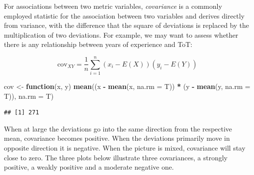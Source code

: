 \documentclass[]{svmono}
\newenvironment{Shaded}{\begin{snugshade}}{\end{snugshade}}
\newcommand{\KeywordTok}[1]{\textcolor[rgb]{0.13,0.29,0.53}{\textbf{#1}}}
\newcommand{\DataTypeTok}[1]{\textcolor[rgb]{0.13,0.29,0.53}{#1}}
\newcommand{\StringTok}[1]{\textcolor[rgb]{0.31,0.60,0.02}{#1}}
\newcommand{\ControlFlowTok}[1]{\textcolor[rgb]{0.13,0.29,0.53}{\textbf{#1}}}
\newcommand{\OperatorTok}[1]{\textcolor[rgb]{0.81,0.36,0.00}{\textbf{#1}}}
\newcommand{\NormalTok}[1]{#1}
\theoremstyle{definition}
\theoremstyle{definition}
\theoremstyle{definition}
\theoremstyle{remark}
\begin{document}
For associations between two metric variables, \emph{covariance} is a
commonly employed statistic for the association between two variables
and derives directly from variance, with the difference that the square
of deviations is replaced by the multiplication of two deviations. For
example, we may want to assess whether there is any relationship between
years of experience and ToT:

\[
\textrm{cov}_{XY} = \frac{1}{n} \sum_{i=1}^n (x_i - E(X)) (y_i - E(Y))
\]

\begin{Shaded}
\begin{Highlighting}[]
\NormalTok{cov <-}\StringTok{ }\ControlFlowTok{function}\NormalTok{(x, y)}
  \KeywordTok{mean}\NormalTok{((x }\OperatorTok{-}\StringTok{ }\KeywordTok{mean}\NormalTok{(x, }\DataTypeTok{na.rm =}\NormalTok{ T)) }\OperatorTok{*}\StringTok{ }\NormalTok{(y }\OperatorTok{-}\StringTok{ }\KeywordTok{mean}\NormalTok{(y, }\DataTypeTok{na.rm =}\NormalTok{ T)), }\DataTypeTok{na.rm =}\NormalTok{ T)}
\end{Highlighting}
\end{Shaded}

\begin{Shaded}
\end{Shaded}

\begin{verbatim}
## [1] 271
\end{verbatim}

When at large the deviations go into the same direction from the
respective mean, covariance becomes positive. When the deviations
primarily move in opposite direction it is negative. When the picture is
mixed, covariance will stay close to zero. The three plots below
illustrate three covariances, a strongly positive, a weakly positive and
a moderate negative one.
\end{document}
